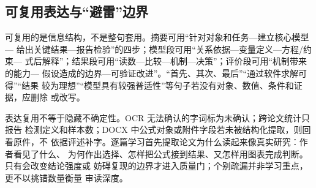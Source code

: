 \subsection{可复用表达与“避雷”边界}

可复用的是信息结构，不是整句套用。摘要可用“针对对象和任务—建立核心模型—
给出关键结果—报告检验”的四步；模型段可用“关系依据—变量定义—方程/约束—
式后解释”；结果段可用“读数—比较—机制—决策”；评价段可用“机制带来的能力—
假设造成的边界—可验证改进”。“首先、其次、最后”“通过软件求解可得”“结果
较为理想”“模型具有较强普适性”等句子若没有对象、数值、条件和证据，应删除
或改写。

表达复用不等于隐藏不确定性。OCR 无法确认的字词标为未确认；跨论文统计只报告
检测定义和样本数；DOCX 中公式对象或附件字段若未被结构化提取，则回看原件，不
依据评述补字。逐篇学习首先提取论文为什么读起来像真实研究：作者看见了什么、
为何作出选择、怎样把公式接到结果、又怎样用图表完成判断。只有会改变结论强度或
妨碍复现的边界才进入质量门；个别疏漏并非学习重点，更不以挑错数量衡量
审读深度。

